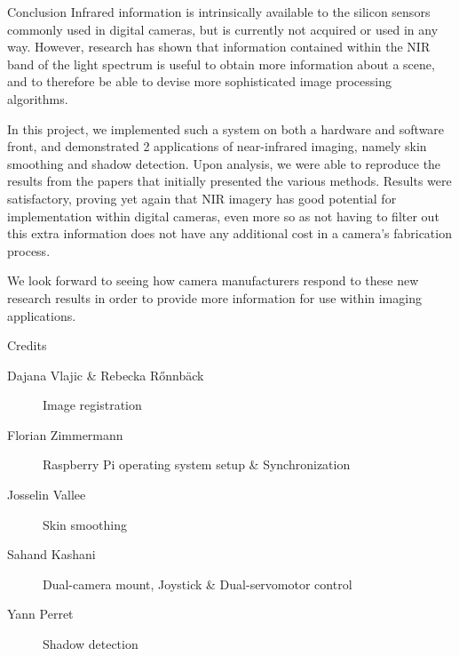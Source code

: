 \documentclass[10pt]{article}
\begin{document}
\newpage

\begin{section}{Conclusion}
    \label{sec:conclusion}
    Infrared information is intrinsically available to the silicon sensors commonly used in digital cameras, but is currently not acquired or used in any way. However, research has shown that information contained within the NIR band of the light spectrum is useful to obtain more information about a scene, and to therefore be able to devise more sophisticated image processing algorithms.

    \medskip

    In this project, we implemented such a system on both a hardware and software front, and demonstrated 2 applications of near-infrared imaging, namely skin smoothing and shadow detection. Upon analysis, we were able to reproduce the results from the papers that initially presented the various methods. Results were satisfactory, proving yet again that NIR imagery has good potential for implementation within digital cameras, even more so as not having to filter out this extra information does not have any additional cost in a camera's fabrication process.

    \medskip

    We look forward to seeing how camera manufacturers respond to these new research results in order to provide more information for use within imaging applications.

\end{section}

\begin{section}{Credits}
    \begin{description}
        \item [Dajana Vlajic \& Rebecka R{\H o}nnb{\"a}ck] Image registration
        \item [Florian Zimmermann] Raspberry Pi operating system setup \& Synchronization
        \item [Josselin Vallee] Skin smoothing
        \item [Sahand Kashani] Dual-camera mount, Joystick \& Dual-servomotor control
        \item [Yann Perret] Shadow detection
    \end{description}
\end{section}
\end{document}

